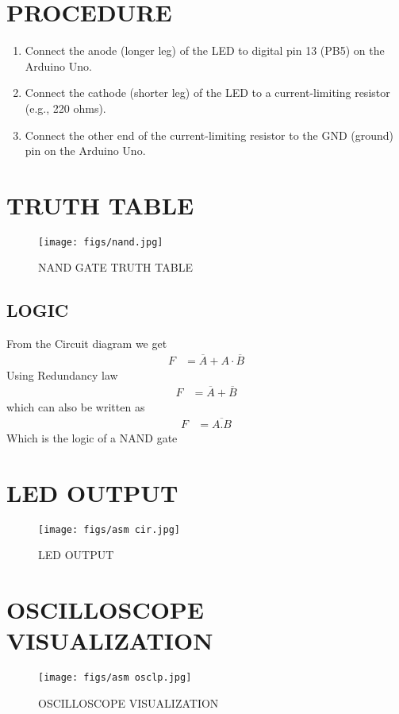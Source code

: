 \documentclass[journal,12pt,twocolumn]{IEEEtran}
\begin{document}
\section{PROCEDURE}
\begin{enumerate}
\item Connect the anode (longer leg) of the LED to digital pin 13 (PB5) on the Arduino Uno.
\item Connect the cathode (shorter leg) of the LED to a current-limiting resistor (e.g., 220 ohms).
\item Connect the other end of the current-limiting resistor to the GND (ground) pin on the Arduino Uno.
\end{enumerate}
\section{TRUTH TABLE}
\begin{figure}[H]
\centering
\texttt{[image: figs/nand.jpg]}
\caption{NAND GATE TRUTH TABLE}
\label{fig:nand.jpg}
\end{figure}
\subsection{LOGIC}
From the Circuit diagram we get
\begin{align}
	F&=\overline{A}+A\cdot\overline{B} 
\end{align}
Using Redundancy law
\begin{align}
	F&=\overline{A}+\overline{B}
\end{align}
which can also be written as
\begin{align}
    F&=\overline{A.B}
\end{align}
Which is the logic of a NAND gate
\section{LED OUTPUT}
\begin{figure}[H]
\centering
\texttt{[image: figs/asm cir.jpg]}
\caption{LED OUTPUT}
\label{fig:asm cir.jpg}
\end{figure}

\section{OSCILLOSCOPE VISUALIZATION}
\begin{figure}[H]
\centering
\texttt{[image: figs/asm osclp.jpg]}
\caption{OSCILLOSCOPE VISUALIZATION}
\label{fig:asm osclp.jpg}
\end{figure}
\end{document}
